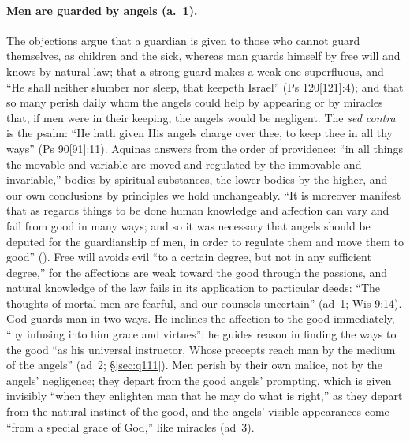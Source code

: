 \paragraph{Men are guarded by angels (a.~1).} The objections argue that a
guardian is given to those who cannot guard themselves, as children and the
sick, whereas man guards himself by free will and knows by natural law; that
a strong guard makes a weak one superfluous, and ``He shall neither slumber
nor sleep, that keepeth Israel'' (Ps 120[121]:4); and that so many perish
daily whom the angels could help by appearing or by miracles that, if men
were in their keeping, the angels would be negligent. The \emph{sed contra}
is the psalm: ``He hath given His angels charge over thee, to keep thee in
all thy ways'' (Ps 90[91]:11). Aquinas answers from the order of providence:
``in all things the movable and variable are moved and regulated by the
immovable and invariable,'' bodies by spiritual substances, the lower bodies
by the higher, and our own conclusions by principles we hold unchangeably.
``It is moreover manifest that as regards things to be done human knowledge
and affection can vary and fail from good in many ways; and so it was
necessary that angels should be deputed for the guardianship of men, in
order to regulate them and move them to good'' (). Free will avoids evil ``to a certain degree, but
not in any sufficient degree,'' for the affections are weak toward the good
through the passions, and natural knowledge of the law fails in its
application to particular deeds: ``The thoughts of mortal men are fearful,
and our counsels uncertain'' (ad~1; Wis 9:14). God guards man in two ways.
He inclines the affection to the good immediately, ``by infusing into him
grace and virtues''; he guides reason in finding the ways to the good ``as
his universal instructor, Whose precepts reach man by the medium of the
angels'' (ad~2; \S\ref{sec:q111}). Men perish by their own malice, not by
the angels' negligence; they depart from the good angels' prompting, which
is given invisibly ``when they enlighten man that he may do what is right,''
as they depart from the natural instinct of the good, and the angels'
visible appearances come ``from a special grace of God,'' like miracles
(ad~3).

